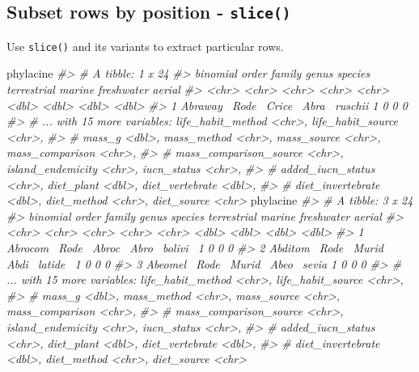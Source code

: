 \documentclass[]{book}
\newenvironment{Shaded}{}{}
\newcommand{\CommentTok}[1]{\textcolor[rgb]{0.38,0.63,0.69}{\textit{#1}}}
\newcommand{\DecValTok}[1]{\textcolor[rgb]{0.25,0.63,0.44}{#1}}
\newcommand{\KeywordTok}[1]{\textcolor[rgb]{0.00,0.44,0.13}{\textbf{#1}}}
\newcommand{\NormalTok}[1]{#1}
\newcommand{\OperatorTok}[1]{\textcolor[rgb]{0.40,0.40,0.40}{#1}}
\newcommand{\StringTok}[1]{\textcolor[rgb]{0.25,0.44,0.63}{#1}}
\begin{document}
\hypertarget{subset-rows-by-position---slice}{%
\subsection{\texorpdfstring{Subset rows by position - \texttt{slice()}}{Subset rows by position - slice()}}\label{subset-rows-by-position---slice}}

Use \texttt{slice()} and its variants to extract particular rows.

\begin{Shaded}
\begin{Highlighting}[]
\NormalTok{phylacine }\OperatorTok{%
\CommentTok{#> # A tibble: 1 x 24}
\CommentTok{#>   binomial order family genus species terrestrial marine freshwater aerial}
\CommentTok{#>   <chr>    <chr> <chr>  <chr> <chr>         <dbl>  <dbl>      <dbl>  <dbl>}
\CommentTok{#> 1 Abraway~ Rode~ Crice~ Abra~ ruschii           1      0          0      0}
\CommentTok{#> # ... with 15 more variables: life_habit_method <chr>, life_habit_source <chr>,}
\CommentTok{#> #   mass_g <dbl>, mass_method <chr>, mass_source <chr>, mass_comparison <chr>,}
\CommentTok{#> #   mass_comparison_source <chr>, island_endemicity <chr>, iucn_status <chr>,}
\CommentTok{#> #   added_iucn_status <chr>, diet_plant <dbl>, diet_vertebrate <dbl>,}
\CommentTok{#> #   diet_invertebrate <dbl>, diet_method <chr>, diet_source <chr>}
\NormalTok{phylacine }\OperatorTok{%
\CommentTok{#> # A tibble: 3 x 24}
\CommentTok{#>   binomial order family genus species terrestrial marine freshwater aerial}
\CommentTok{#>   <chr>    <chr> <chr>  <chr> <chr>         <dbl>  <dbl>      <dbl>  <dbl>}
\CommentTok{#> 1 Abrocom~ Rode~ Abroc~ Abro~ bolivi~           1      0          0      0}
\CommentTok{#> 2 Abditom~ Rode~ Murid~ Abdi~ latide~           1      0          0      0}
\CommentTok{#> 3 Abeomel~ Rode~ Murid~ Abeo~ sevia             1      0          0      0}
\CommentTok{#> # ... with 15 more variables: life_habit_method <chr>, life_habit_source <chr>,}
\CommentTok{#> #   mass_g <dbl>, mass_method <chr>, mass_source <chr>, mass_comparison <chr>,}
\CommentTok{#> #   mass_comparison_source <chr>, island_endemicity <chr>, iucn_status <chr>,}
\CommentTok{#> #   added_iucn_status <chr>, diet_plant <dbl>, diet_vertebrate <dbl>,}
\CommentTok{#> #   diet_invertebrate <dbl>, diet_method <chr>, diet_source <chr>}
}}
\end{Highlighting}
\end{Shaded}
\end{document}
